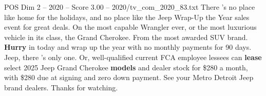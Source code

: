 \begin{textsample}{POS Dim 2 – 2020 – Score 3.00 – 2020/tv\_com\_2020\_83.txt}  \label{ex:f2_pos_071}
There 's no place like home for the holidays, and no place like the Jeep Wrap-Up the Year sales event for great deals.
On the most capable Wrangler ever, or the most luxurious vehicle in its class, the Grand Cherokee.
From the most awarded SUV brand. \textbf{Hurry} in today and wrap up the year with no monthly payments for 90 days.
Jeep, there 's only one.
Or, well-qualified current FCA employee lessees can \textbf{lease} select 2025 Jeep Grand Cherokee \textbf{models} and dealer stock for \$280 a month, with \$280 due at signing and zero down payment.
See your Metro Detroit Jeep brand dealers.
Thanks for watching.

\end{textsample}
